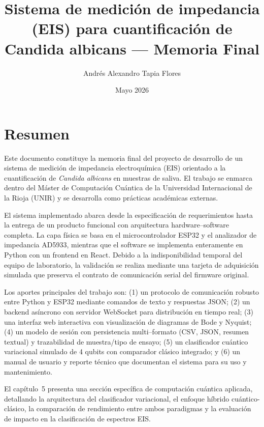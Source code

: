 \documentclass[11pt,a4paper,spanish]{book}
\title{Sistema de medici\'{o}n de impedancia (EIS) para cuantificaci\'{o}n de Candida albicans --- Memoria Final}
\author{Andr\'{e}s Alexandro Tapia Flores}
\date{Mayo 2026}
\begin{document}
\renewcommand{\listfigurename}{\'{I}ndice de figuras}
\renewcommand{\listtablename}{\'{I}ndice de tablas}
\renewcommand{\contentsname}{\'{I}ndice de contenidos}
\renewcommand{\figurename}{Figura}
\renewcommand{\tablename}{Tabla}
\setlength{\headheight}{26pt}

\maketitle
\frontmatter
\tableofcontents
\listoffigures
\listoftables

\chapter{Resumen}

Este documento constituye la memoria final del proyecto de desarrollo de un sistema de medici\'{o}n de impedancia electroqu\'{i}mica (EIS) orientado a la cuantificaci\'{o}n de \textit{Candida albicans} en muestras de saliva. El trabajo se enmarca dentro del M\'{a}ster de Computaci\'{o}n Cu\'{a}ntica de la Universidad Internacional de la Rioja (UNIR) y se desarrolla como pr\'{a}cticas acad\'{e}micas externas.

El sistema implementado abarca desde la especificaci\'{o}n de requerimientos hasta la entrega de un producto funcional con arquitectura hardware--software completa. La capa f\'{i}sica se basa en el microcontrolador ESP32 y el analizador de impedancia AD5933, mientras que el software se implementa enteramente en Python con un frontend en React. Debido a la indisponibilidad temporal del equipo de laboratorio, la validaci\'{o}n se realiza mediante una tarjeta de adquisici\'{o}n simulada que preserva el contrato de comunicaci\'{o}n serial del firmware original.

Los aportes principales del trabajo son: (1) un protocolo de comunicaci\'{o}n robusto entre Python y ESP32 mediante comandos de texto y respuestas JSON; (2) un backend as\'{i}ncrono con servidor WebSocket para distribuci\'{o}n en tiempo real; (3) una interfaz web interactiva con visualizaci\'{o}n de diagramas de Bode y Nyquist; (4) un modelo de sesi\'{o}n con persistencia multi--formato (CSV, JSON, resumen textual) y trazabilidad de muestra/tipo de ensayo; (5) un clasificador cu\'{a}ntico variacional simulado de 4 qubits con comparador cl\'{a}sico integrado; y (6) un manual de usuario y reporte t\'{e}cnico que documentan el sistema para su uso y mantenimiento.

El cap\'{i}tulo~5 presenta una secci\'{o}n espec\'{i}fica de computaci\'{o}n cu\'{a}ntica aplicada, detallando la arquitectura del clasificador variacional, el enfoque h\'{i}brido cu\'{a}ntico-cl\'{a}sico, la comparaci\'{o}n de rendimiento entre ambos paradigmas y la evaluaci\'{o}n de impacto en la clasificaci\'{o}n de espectros EIS.
\end{document}
